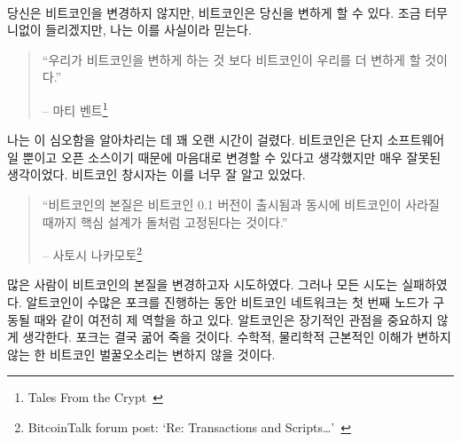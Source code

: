\paragraph{}
당신은 비트코인을 변경하지 않지만, 비트코인은 당신을 변하게 할 수 있다.
조금 터무니없이 들리겠지만, 나는 이를 사실이라 믿는다.


\begin{quotation}\begin{samepage}
		\enquote{우리가 비트코인을 변하게 하는 것 보다 비트코인이 우리를 더 변하게 할 것이다.}
		\begin{flushright} -- 마티 벤트\footnote{Tales From the Crypt~\cite{tftc21}}
\end{flushright}\end{samepage}\end{quotation}

나는 이 심오함을 알아차리는 데 꽤 오랜 시간이 걸렸다.
비트코인은 단지 소프트웨어일 뿐이고 오픈 소스이기 때문에 
마음대로 변경할 수 있다고 생각했지만 매우 잘못된 생각이었다. 
비트코인 창시자는 이를 너무 잘 알고 있었다.

\begin{quotation}\begin{samepage}
		\enquote{비트코인의 본질은 비트코인 0.1 버전이 출시됨과 동시에 비트코인이 사라질 때까지 
			핵심 설계가 돌처럼 고정된다는 것이다.}
		\begin{flushright} -- 사토시 나카모토\footnote{BitcoinTalk forum post: `Re:
				Transactions and Scripts\ldots'~\cite{satoshi-set-in-stone}}
\end{flushright}\end{samepage}\end{quotation}

많은 사람이 비트코인의 본질을 변경하고자 시도하였다. 그러나 모든 시도는 실패하였다. 알트코인이 수많은
포크를 진행하는 동안 비트코인 네트워크는 첫 번째 노드가 구동될 때와 같이 여전히 제 역할을 하고 있다.
알트코인은 장기적인 관점을 중요하지 않게 생각한다. 포크는 결국 굶어 죽을 것이다. 수학적, 물리학적 근본적인 
이해가 변하지 않는 한 비트코인 벌꿀오소리는 변하지 않을 것이다.

